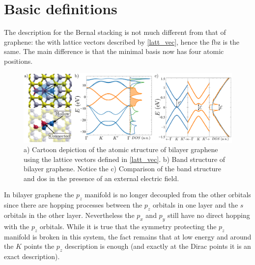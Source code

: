 \section{Basic definitions}
The description for the Bernal stacking is not much different from that of graphene: the  with lattice vectors described by \eqref{latt_vec}, hence the \ac{fbz} is the same. The main difference is that the minimal basis now has four atomic positions.
\begin{figure}[h!]
\centering
\includegraphics{graphene_bilayer/figures/graphene_bi_summary.pdf}
\vspace{-5pt}
\caption{a) Cartoon depiction of the atomic structure of bilayer graphene using the lattice vectors defined in \eqref{latt_vec}. b) Band structure of bilayer graphene. Notice the c) Comparison of the band structure and \ac{dos} in the presence of an external electric field.}
\label{Gbi_summary}
\end{figure}
\FloatBarrier
In bilayer graphene the $p_z$ manifold is no longer decoupled from the other orbitals since there are hopping processes between the $p_z$ orbitals in one layer and the $s$ orbitals in the other layer. Nevertheless the $p_x$ and $p_y$ still have no direct hopping with the $p_z$ orbitals.
While it is true that the symmetry protecting the $p_z$ manifold is broken in this system, the fact remains that at low energy and around the $K$ points the $p_z$ description is enough (and exactly at the Dirac points it is an exact description).\\

%
%


